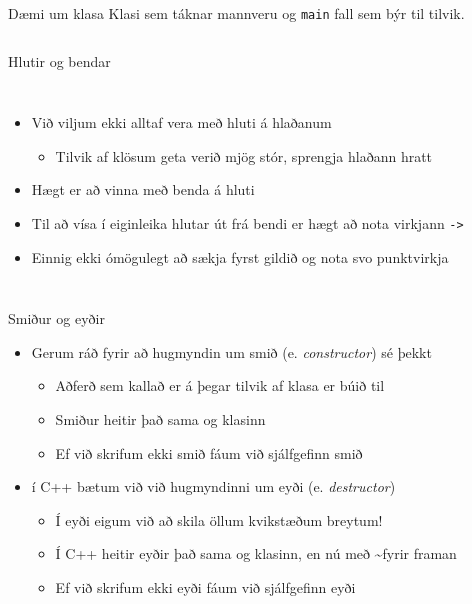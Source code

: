 \documentclass[handout]{beamer}
\begin{document}
\begin{frame}{Dæmi um klasa}
Klasi sem táknar mannveru og \texttt{main} fall sem býr til tilvik.
\begin{columns}
\end{columns}
\end{frame}

\begin{frame}{Hlutir og bendar}
\begin{columns}
\begin{itemize}
 \item Við viljum ekki alltaf vera með hluti á hlaðanum
 \begin{itemize}
  \item Tilvik af klösum geta verið mjög stór, sprengja hlaðann hratt
 \end{itemize} 
 \item Hægt er að vinna með benda á hluti
 \item Til að vísa í eiginleika hlutar út frá bendi er hægt að nota virkjann \texttt{->}
 \item Einnig ekki ómögulegt að sækja fyrst gildið og nota svo punktvirkja
\end{itemize}
\end{columns}
\end{frame}

\begin{frame}{Smiður og eyðir}
\begin{itemize}
 \item Gerum ráð fyrir að hugmyndin um smið (e. \emph{constructor}) sé þekkt
 \begin{itemize}
  \item Aðferð sem kallað er á þegar tilvik af klasa er búið til
  \item Smiður heitir það sama og klasinn
  \item Ef við skrifum ekki smið fáum við sjálfgefinn smið
 \end{itemize}
 \item í C++ bætum við við hugmyndinni um eyði (e. \emph{destructor}) 
 \begin{itemize}
  \item Í eyði eigum við að skila öllum kvikstæðum breytum!
  \item Í C++ heitir eyðir það sama og klasinn, en nú með \textasciitilde fyrir framan
  \item Ef við skrifum ekki eyði fáum við sjálfgefinn eyði
 \end{itemize}
\end{itemize}
\end{frame}
\end{document}
